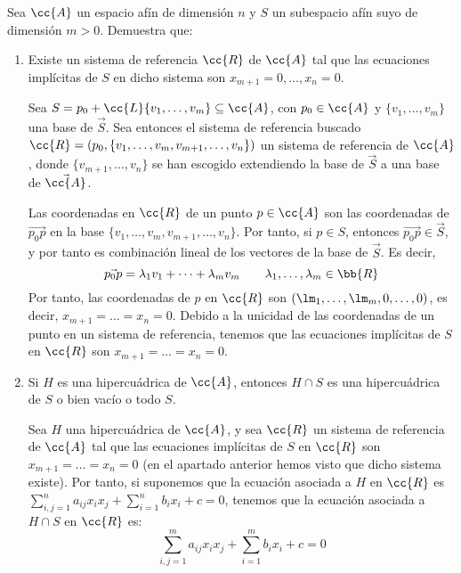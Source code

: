 \begin{ejercicio}\label{ej:5.3.3}
    Sea $\cc{A}$ un espacio afín de dimensión $n$ y $S$ un subespacio afín suyo de dimensión $m > 0$. Demuestra que:
    \begin{enumerate}
        \item Existe un sistema de referencia $\cc{R}$ de $\cc{A}$ tal que las ecuaciones implícitas de $S$ en dicho sistema son $x_{m+1} = 0, \dots , x_n = 0$.
        
        Sea $S=p_0+\cc{L}\{v_1,\dots,v_m\} \subseteq \cc{A}$, con $p_0\in \cc{A}$ y $\{v_1,\dots,v_m\}$ una base de $\vec{S}$.
        Sea entonces el sistema de referencia buscado $\cc{R}=(p_0,\{v_1,\dots,v_m, v_{m+1},\dots, v_n\})$ un sistema de referencia de $\cc{A}$, donde $\{v_{m+1},\dots,v_n\}$ se han escogido extendiendo la base de $\vec{S}$ a una base de $\vec{\cc{A}}$.
        
        Las coordenadas en $\cc{R}$ de un punto $p\in \cc{A}$ son las coordenadas de $\vec{p_0p}$ en la base $\{v_1,\dots,v_m, v_{m+1},\dots, v_n\}$.
        Por tanto, si $p\in S$, entonces $\vec{p_0p}\in \vec{S}$, y por tanto es combinación lineal de los vectores de la base de $\vec{S}$. Es decir,
        \begin{equation*}
            \vec{p_0p}=\lambda_1v_1+\dots+\lambda_mv_m \qquad \lambda_1,\dots,\lambda_m\in \bb{R}
        \end{equation*}
        Por tanto, las coordenadas de $p$ en $\cc{R}$ son $(\lm_1, \dots, \lm_m, 0, \dots, 0)$, es decir, $x_{m+1}=\dots=x_n=0$.
        Debido a la unicidad de las coordenadas de un punto en un sistema de referencia, tenemos que las ecuaciones implícitas de $S$ en $\cc{R}$ son $x_{m+1}=\dots=x_n=0$.

        \item \label{item:5.3.3.b} Si $H$ es una hipercuádrica de $\cc{A}$, entonces $H \cap S$ es una hipercuádrica de $S$ o bien vacío o todo $S$.
        
        Sea $H$ una hipercuádrica de $\cc{A}$, y sea $\cc{R}$ un sistema de referencia de $\cc{A}$ tal que las ecuaciones implícitas de $S$ en $\cc{R}$ son $x_{m+1}=\dots=x_n=0$ (en el apartado anterior hemos visto que dicho sistema existe).
        Por tanto, si suponemos que la ecuación asociada a $H$ en $\cc{R}$ es $\sum\limits_{i,j=1}^n a_{ij}x_ix_j+\sum\limits_{i=1}^n b_ix_i+c=0$, tenemos que la ecuación asociada a $H\cap S$ en $\cc{R}$ es:
        \begin{equation*}
            \sum\limits_{i,j=1}^m a_{ij}x_ix_j+\sum\limits_{i=1}^m b_ix_i+c=0
        \end{equation*}


\end{enumerate}
\end{ejercicio}
